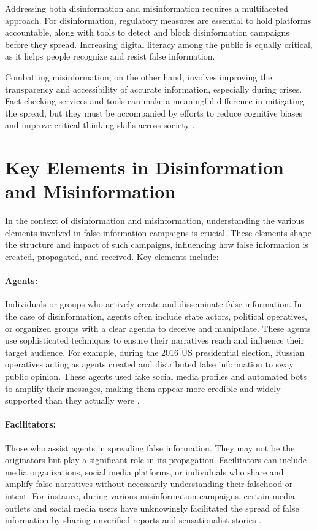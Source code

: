\documentclass{Configuration_Files/PoliMi3i_thesis}
\begin{document}
Addressing both disinformation and misinformation requires a multifaceted approach. For disinformation, regulatory measures are essential to hold platforms accountable, along with tools to detect and block disinformation campaigns before they spread. Increasing digital literacy among the public is equally critical, as it helps people recognize and resist false information.

Combatting misinformation, on the other hand, involves improving the transparency and accessibility of accurate information, especially during crises. Fact-checking services and tools can make a meaningful difference in mitigating the spread, but they must be accompanied by efforts to reduce cognitive biases and improve critical thinking skills across society \cite{mcgrew2017challenge, pennycook2019fighting}.


\section{Key Elements in Disinformation and Misinformation} \label{sec:key_elements_disinform_misinform}
In the context of disinformation and misinformation, understanding the various elements involved in false information campaigns is crucial. These elements shape the structure and impact of such campaigns, influencing how false information is created, propagated, and received. Key elements include:

\paragraph{Agents:} Individuals or groups who actively create and disseminate false information. In the case of disinformation, agents often include state actors, political operatives, or organized groups with a clear agenda to deceive and manipulate. These agents use sophisticated techniques to ensure their narratives reach and influence their target audience. For example, during the 2016 US presidential election, Russian operatives acting as agents created and distributed false information to sway public opinion. These agents used fake social media profiles and automated bots to amplify their messages, making them appear more credible and widely supported than they actually were \cite{bovet2019influence}.

\paragraph{Facilitators:} Those who assist agents in spreading false information. They may not be the originators  but play a significant role in its propagation. Facilitators can include media organizations, social media platforms, or individuals who share and amplify false narratives without necessarily understanding their falsehood or intent. For instance, during various misinformation campaigns, certain media outlets and social media users have unknowingly facilitated the spread of false information by sharing unverified reports and sensationalist stories \cite{marwick2017media}.
\end{document}
